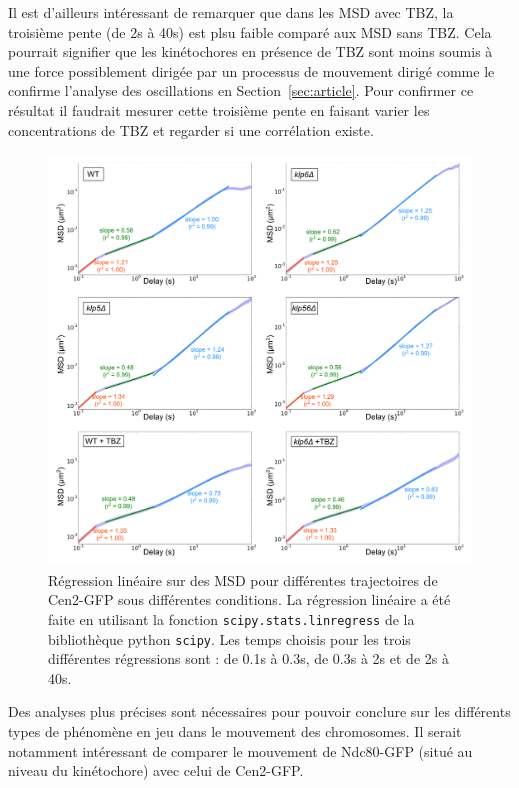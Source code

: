 \documentclass[12pt,a4paper,twoside,openright]{book}
\begin{document}
Il est d'ailleurs intéressant de remarquer que dans les MSD avec TBZ, la
troisième pente (de 2s à 40s) est plsu faible comparé aux MSD sans TBZ.
Cela pourrait signifier que les kinétochores en présence de TBZ sont
moins soumis à une force possiblement dirigée par un processus de
mouvement dirigé comme le confirme l'analyse des oscillations en
Section~\ref{sec:article}. Pour confirmer ce résultat il faudrait
mesurer cette troisième pente en faisant varier les concentrations de
TBZ et regarder si une corrélation existe.

\begin{figure}[htbp]
\centering
\includegraphics{figures/results/imaging/msds_log_fit.png}
\caption[Régression linéaire sur des MSD pour différentes trajectoires de Cen2-GFP sous différentes conditions]{\label{fig:msds-log-fit}Régression
linéaire sur des MSD pour différentes trajectoires de Cen2-GFP sous
différentes conditions. La régression linéaire a été faite en utilisant
la fonction \texttt{scipy.stats.linregress} de la bibliothèque python
\texttt{scipy}. Les temps choisis pour les trois différentes régressions
sont : de 0.1s à 0.3s, de 0.3s à 2s et de 2s à 40s.}
\end{figure}

Des analyses plus précises sont nécessaires pour pouvoir conclure sur
les différents types de phénomène en jeu dans le mouvement des
chromosomes. Il serait notamment intéressant de comparer le mouvement de
Ndc80-GFP (situé au niveau du kinétochore) avec celui de Cen2-GFP.
\end{document}
